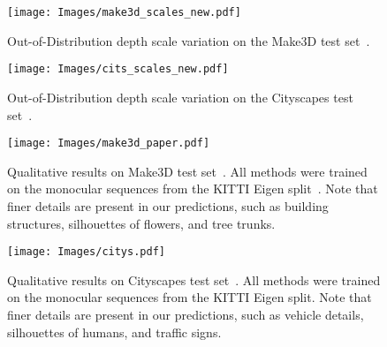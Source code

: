 \begin{figure}[ht]
\centering
  \texttt{[image: Images/make3d\_scales\_new.pdf]}
  \caption{Out-of-Distribution depth scale variation on the Make3D test set~\cite{saxena2008make3d}. }
\label{fig:make3d_scales}
\end{figure}

\begin{figure}[ht]
\centering
  \texttt{[image: Images/cits\_scales\_new.pdf]}
  \caption{Out-of-Distribution depth scale variation on the Cityscapes test set~\cite{cordts2016cityscapes}. }
\label{fig:citys_scales}
\end{figure}

\begin{figure}[ht]
\centering
  \texttt{[image: Images/make3d\_paper.pdf]}
  \caption{Qualitative results on Make3D test set~\cite{saxena2008make3d}. All methods were trained on the monocular sequences from the KITTI Eigen split~\cite{eigen2014depth}. Note that finer details are present in our predictions, such as building structures, silhouettes of flowers, and tree trunks.}
\label{fig:make3d_depth}
\end{figure}



\begin{figure}[hbt]
\centering
  \texttt{[image: Images/citys.pdf]}
  \caption{Qualitative results on Cityscapes test set~\cite{cordts2016cityscapes}. All methods were trained on the monocular sequences from the KITTI Eigen split. Note that finer details are present in our predictions, such as vehicle details, silhouettes of humans, and traffic signs.}
\label{fig:citys_depth}
\end{figure}








































